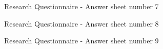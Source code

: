 \documentclass[a4paper]{article}
\begin{document}
\begin{appendices}
\begin{figure}[h!]
		\caption{Research Questionnaire - Answer sheet number 7}
	\end{figure}
	\newpage
	\begin{figure}[h!]
		\caption{Research Questionnaire - Answer sheet number 8}
	\end{figure}
	\newpage
	\begin{figure}[h!]
		\caption{Research Questionnaire - Answer sheet number 9}
	\end{figure}
	\newpage

\end{appendices}
\end{document}
